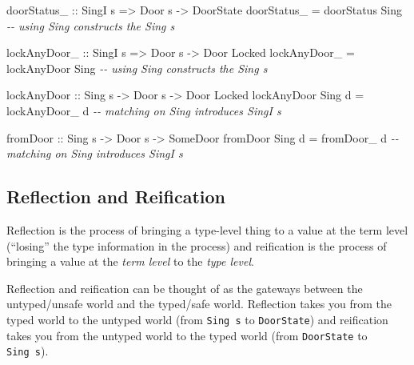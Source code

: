 \documentclass[]{article}
\newenvironment{Shaded}{}{}
\newcommand{\CommentTok}[1]{\textcolor[rgb]{0.38,0.63,0.69}{\textit{#1}}}
\newcommand{\DataTypeTok}[1]{\textcolor[rgb]{0.56,0.13,0.00}{#1}}
\newcommand{\NormalTok}[1]{#1}
\newcommand{\OtherTok}[1]{\textcolor[rgb]{0.00,0.44,0.13}{#1}}
\begin{document}
\begin{Shaded}
\begin{Highlighting}[]
\OtherTok{doorStatus\_ ::} \DataTypeTok{SingI}\NormalTok{ s }\OtherTok{=>} \DataTypeTok{Door}\NormalTok{ s }\OtherTok{{-}>} \DataTypeTok{DoorState}
\NormalTok{doorStatus\_ }\OtherTok{=}\NormalTok{ doorStatus }\DataTypeTok{Sing}           \CommentTok{{-}{-} using Sing constructs the Sing s}

\OtherTok{lockAnyDoor\_ ::} \DataTypeTok{SingI}\NormalTok{ s }\OtherTok{=>} \DataTypeTok{Door}\NormalTok{ s }\OtherTok{{-}>} \DataTypeTok{Door} \DataTypeTok{\textquotesingle{}Locked}
\NormalTok{lockAnyDoor\_ }\OtherTok{=}\NormalTok{ lockAnyDoor }\DataTypeTok{Sing}         \CommentTok{{-}{-} using Sing constructs the Sing s}

\OtherTok{lockAnyDoor ::} \DataTypeTok{Sing}\NormalTok{ s }\OtherTok{{-}>} \DataTypeTok{Door}\NormalTok{ s }\OtherTok{{-}>} \DataTypeTok{Door} \DataTypeTok{\textquotesingle{}Locked}
\NormalTok{lockAnyDoor }\DataTypeTok{Sing}\NormalTok{ d }\OtherTok{=}\NormalTok{ lockAnyDoor\_ d     }\CommentTok{{-}{-} matching on Sing introduces SingI s}

\OtherTok{fromDoor ::} \DataTypeTok{Sing}\NormalTok{ s }\OtherTok{{-}>} \DataTypeTok{Door}\NormalTok{ s }\OtherTok{{-}>} \DataTypeTok{SomeDoor}
\NormalTok{fromDoor }\DataTypeTok{Sing}\NormalTok{ d }\OtherTok{=}\NormalTok{ fromDoor\_ d           }\CommentTok{{-}{-} matching on Sing introduces SingI s}
\end{Highlighting}
\end{Shaded}

\hypertarget{reflection-and-reification}{%
\subsection{Reflection and Reification}\label{reflection-and-reification}}

Reflection is the process of bringing a type-level thing to a value at the term
level (``losing'' the type information in the process) and reification is the
process of bringing a value at the \emph{term level} to the \emph{type level}.

Reflection and reification can be thought of as the gateways between the
untyped/unsafe world and the typed/safe world. Reflection takes you from the
typed world to the untyped world (from \texttt{Sing\ s} to \texttt{DoorState})
and reification takes you from the untyped world to the typed world (from
\texttt{DoorState} to \texttt{Sing\ s}).
\end{document}
